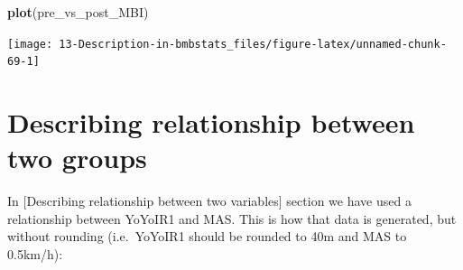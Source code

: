 \documentclass[
]{book}
\newenvironment{Shaded}{\begin{snugshade}}{\end{snugshade}}
\newcommand{\KeywordTok}[1]{\textcolor[rgb]{0.13,0.29,0.53}{\textbf{#1}}}
\newcommand{\NormalTok}[1]{#1}
\begin{document}
\begin{Shaded}
\begin{Highlighting}[]
\KeywordTok{plot}\NormalTok{(pre\_vs\_post\_MBI)}
\end{Highlighting}
\end{Shaded}

\begin{center}\texttt{[image: 13-Description-in-bmbstats\_files/figure-latex/unnamed-chunk-69-1]} \end{center}

\hypertarget{describing-relationship-between-two-groups}{%
\section{Describing relationship between two groups}\label{describing-relationship-between-two-groups}}

In {[}Describing relationship between two variables{]} section we have used a relationship between YoYoIR1 and MAS. This is how that data is generated, but without rounding (i.e.~YoYoIR1 should be rounded to 40m and MAS to 0.5km/h):
\end{document}
